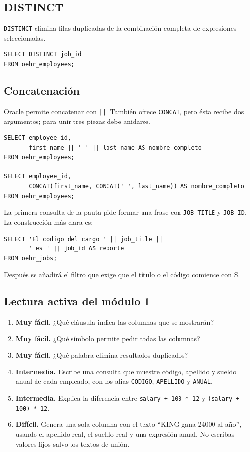 \documentclass[11pt,a4paper]{article}
\newcommand{\campo}[1]{\texttt{#1}}
\newcommand{\nivel}[1]{\textbf{#1}}
\begin{document}
\subsection{DISTINCT}

\campo{DISTINCT} elimina filas duplicadas de la combinación completa de expresiones seleccionadas.

\begin{lstlisting}
SELECT DISTINCT job_id
FROM oehr_employees;
\end{lstlisting}

\subsection{Concatenación}

Oracle permite concatenar con \campo{||}. También ofrece \campo{CONCAT}, pero ésta recibe dos
argumentos; para unir tres piezas debe anidarse.

\begin{lstlisting}
SELECT employee_id,
       first_name || ' ' || last_name AS nombre_completo
FROM oehr_employees;

SELECT employee_id,
       CONCAT(first_name, CONCAT(' ', last_name)) AS nombre_completo
FROM oehr_employees;
\end{lstlisting}

\begin{prueba}
La primera consulta de la pauta pide formar una frase con \campo{JOB\_TITLE} y \campo{JOB\_ID}.
La construcción más clara es:
\begin{lstlisting}
SELECT 'El codigo del cargo ' || job_title ||
       ' es ' || job_id AS reporte
FROM oehr_jobs;
\end{lstlisting}
Después se añadirá el filtro que exige que el título o el código comience con S.
\end{prueba}

\subsection{Lectura activa del módulo 1}

\begin{enumerate}[label=\textbf{M1.\arabic*}]
  \item \nivel{Muy fácil.} ¿Qué cláusula indica las columnas que se mostrarán?
  \item \nivel{Muy fácil.} ¿Qué símbolo permite pedir todas las columnas?
  \item \nivel{Muy fácil.} ¿Qué palabra elimina resultados duplicados?
  \item \nivel{Intermedia.} Escribe una consulta que muestre código, apellido y sueldo anual de cada
  empleado, con los alias \campo{CODIGO}, \campo{APELLIDO} y \campo{ANUAL}.
  \item \nivel{Intermedia.} Explica la diferencia entre \campo{salary + 100 * 12} y
  \campo{(salary + 100) * 12}.
  \item \nivel{Difícil.} Genera una sola columna con el texto
  ``KING gana 24000 al año'', usando el apellido real, el sueldo real y una expresión anual. No
  escribas valores fijos salvo los textos de unión.
\end{enumerate}
\end{document}
